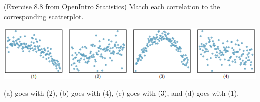 \documentclass[12pt,answers]{exam}
\newcounter{countA}
\begin{document}
\begin{questions}
\begin{parts}
\end{parts}

\question (\href{http://people.hsc.edu/faculty-staff/blins/books/OpenIntroStats4e.pdf\#eoce.8.8}{Exercise 8.8 from OpenIntro Statistics}) Match each correlation to the corresponding scatterplot.
\begin{center}
\includegraphics[scale=0.6]{correlations.png}
\end{center}


\begin{solution}
(a) goes with (2), (b) goes with (4), (c) goes with (3), and (d) goes with (1).
\end{solution}
\bigskip

\setcounter{countA}{\value{question}}


\end{questions}
\end{document}
